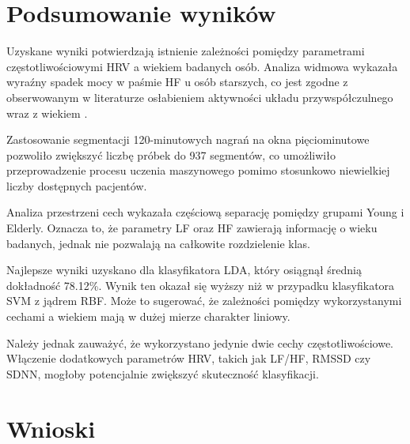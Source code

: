 \documentclass[a4paper,12pt]{article}
\begin{document}
\section{Podsumowanie wyników}

Uzyskane wyniki potwierdzają istnienie zależności pomiędzy parametrami częstotliwościowymi HRV a wiekiem badanych osób. Analiza widmowa wykazała wyraźny spadek mocy w paśmie HF u osób starszych, co jest zgodne z obserwowanym w literaturze osłabieniem aktywności układu przywspółczulnego wraz z wiekiem \cite{fantasia}.

Zastosowanie segmentacji 120-minutowych nagrań na okna pięciominutowe pozwoliło zwiększyć liczbę próbek do 937 segmentów, co umożliwiło przeprowadzenie procesu uczenia maszynowego pomimo stosunkowo niewielkiej liczby dostępnych pacjentów.

Analiza przestrzeni cech wykazała częściową separację pomiędzy grupami Young i Elderly. Oznacza to, że parametry LF oraz HF zawierają informację o wieku badanych, jednak nie pozwalają na całkowite rozdzielenie klas.

Najlepsze wyniki uzyskano dla klasyfikatora LDA, który osiągnął średnią dokładność 78.12\%. Wynik ten okazał się wyższy niż w przypadku klasyfikatora SVM z jądrem RBF. Może to sugerować, że zależności pomiędzy wykorzystanymi cechami a wiekiem mają w dużej mierze charakter liniowy.

Należy jednak zauważyć, że wykorzystano jedynie dwie cechy częstotliwościowe. Włączenie dodatkowych parametrów HRV, takich jak LF/HF, RMSSD czy SDNN, mogłoby potencjalnie zwiększyć skuteczność klasyfikacji.

\section{Wnioski}
\end{document}
